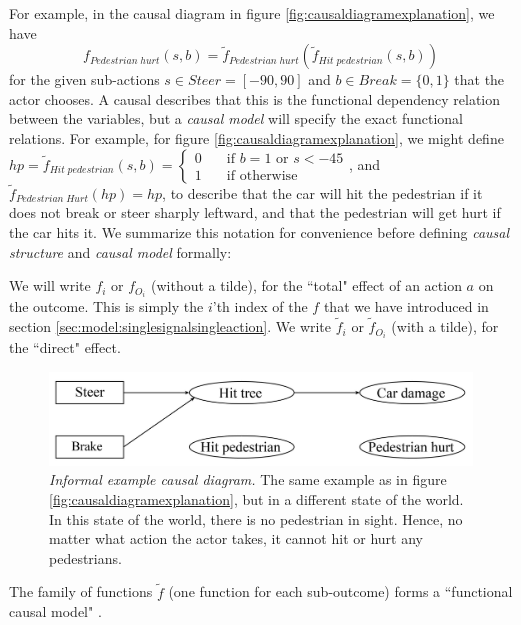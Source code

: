 For example, in the causal diagram in figure \ref{fig:causaldiagramexplanation}, we have \[f_{Pedestrian\;hurt}(s,b)=\tilde f_{Pedestrian\;hurt}(\tilde f_{Hit\;pedestrian}(s,b))\]
for the given sub-actions $s\in Steer=[-90,90]$ and $b\in Break=\{0,1\}$ that the actor chooses. A causal describes that this is the functional dependency relation between the variables, but a \textit{causal model} will specify the exact functional relations. For example, for figure \ref{fig:causaldiagramexplanation}, we might define $hp=\tilde f_{Hit\;pedestrian}(s,b)= \begin{cases}
0\quad & \text{if }b=1 \text{ or } s<-45\\
1\quad & \text{if otherwise }
\end{cases}$, and $\tilde f_{Pedestrian\;Hurt}(hp)=hp$, to describe that the car will hit the pedestrian if it does not break or steer sharply leftward, and that the pedestrian will get hurt if the car hits it. We summarize this notation for convenience before defining \textit{causal structure} and \textit{causal model} formally:

\begin{notation*}
	We will write $f_i$ or $f_{O_i}$ (without a tilde), for the ``total" effect of an action $a$ on the outcome. This is simply the $i$'th index of the $f$ that we have introduced in section \ref{sec:model:singlesignalsingleaction}. We write $\tilde f_i$ or $\tilde f_{O_i}$ (with a tilde), for the ``direct" effect. 
\end{notation*}

\begin{figure}[H]
	\centering
	\captionsetup{labelfont=bf,font=small,labelsep=period}
	\includegraphics[width=0.7\linewidth]{"images/diagramexplanations/causaldiagramexplanation2"}
	\caption{\rightskip=20pt\leftskip=20pt \textit{Informal example causal diagram.} The same example as in figure \ref{fig:causaldiagramexplanation}, but in a different state of the world. In this state of the world, there is no pedestrian in sight. Hence, no matter what action the actor takes, it cannot hit or hurt any pedestrians.
	}
	\label{fig:causaldiagramexplanation2} 	
\end{figure}

The family of functions $\tilde f$ (one function for each sub-outcome) forms a ``functional causal model" \citep{Pearl2000}. 

